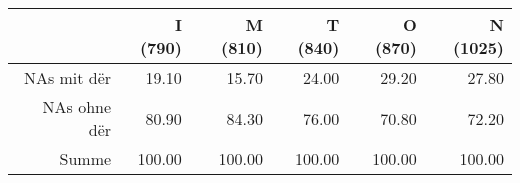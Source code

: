 \begin{tabular}{rrrrrr}
  \hline
 & I (790) & M (810) & T (840) & O (870) & N (1025) \\ 
  \hline
NAs mit dër & 19.10 & 15.70 & 24.00 & 29.20 & 27.80 \\ 
  NAs ohne dër & 80.90 & 84.30 & 76.00 & 70.80 & 72.20 \\ 
  Summe & 100.00 & 100.00 & 100.00 & 100.00 & 100.00 \\ 
   \hline
\end{tabular}
